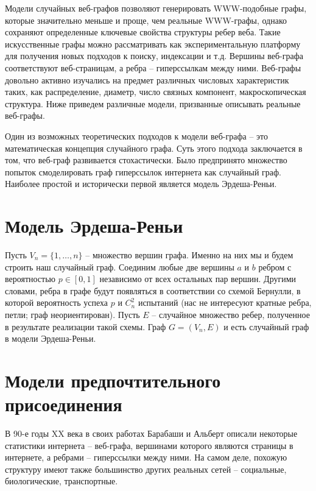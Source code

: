 \documentclass[14pt]{extreport}
\begin{document}
Модели случайных веб-графов позволяют генерировать WWW-подобные графы, которые значительно меньше и проще, чем реальные WWW-графы, однако сохраняют определенные ключевые свойства структуры ребер веба. Такие искусственные графы можно рассматривать как экспериментальную платформу для получения новых подходов к поиску, индексации и т.д.
Вершины веб-графа соответствуют веб-страницам, а ребра – гиперссылкам между ними. Веб-графы довольно активно изучались на предмет различных числовых характеристик таких, как распределение, диаметр, число связных компонент, макроскопическая структура. Ниже приведем различные модели, призванные описывать реальные веб-графы.

Один из возможных теоретических подходов к модели веб-графа -- это математическая концепция случайного графа. Суть этого подхода заключается в том, что веб-граф развивается стохастически.
Было предпринято множество попыток смоделировать граф гиперссылок интернета как случайный граф. Наиболее простой и исторически первой является модель Эрдеша-Реньи.

\section{Модель Эрдеша-Реньи}  

Пусть $V_n = \{1,\dots,n\}$ -- множество вершин графа. Именно на них мы и будем строить наш случайный граф. Соединим любые две вершины $a$ и $b$ ребром с вероятностью $p \in [0, 1]$ независимо от всех остальных пар вершин. Другими словами, ребра в графе будут появляться в соответствии со схемой Бернулли, в которой вероятность успеха $p$ и $C_n^2$ испытаний (нас не интересуют кратные ребра, петли; граф неориентирован). Пусть $E$ -- случайное множество ребер, полученное в результате реализации такой схемы. Граф $G = (V_n, E)$ и есть случайный граф в модели Эрдеша-Реньи.

\section{Модели предпочтительного присоединения}

В 90-е годы XX века в своих работах Барабаши и Альберт описали некоторые статистики интернета -- веб-графа, вершинами которого являются страницы в интернете, а ребрами -- гиперссылки между ними. На самом деле, похожую структуру имеют также большинство других реальных сетей -- социальные, биологические, транспортные.
\end{document}
